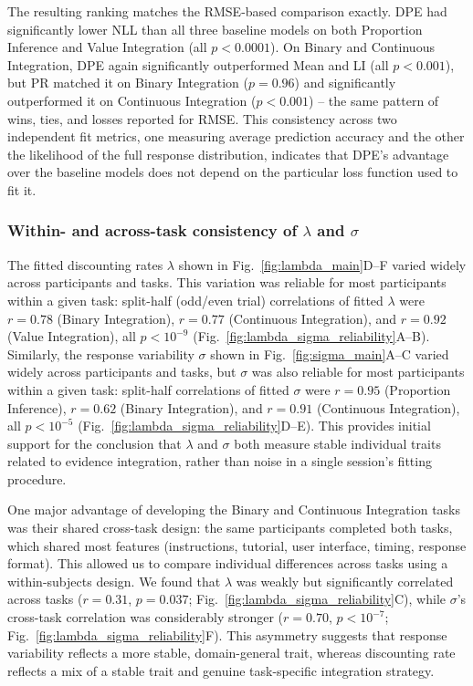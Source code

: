\documentclass[12pt]{article}
\begin{document}
The resulting ranking matches the RMSE-based comparison exactly. DPE had significantly lower NLL than all three baseline models on both Proportion Inference and Value Integration (all $p<0.0001$). On Binary and Continuous Integration, DPE again significantly outperformed Mean and LI (all $p<0.001$), but PR matched it on Binary Integration ($p=0.96$) and significantly outperformed it on Continuous Integration ($p<0.001$) -- the same pattern of wins, ties, and losses reported for RMSE. This consistency across two independent fit metrics, one measuring average prediction accuracy and the other the likelihood of the full response distribution, indicates that DPE's advantage over the baseline models does not depend on the particular loss function used to fit it.

\subsubsection*{Within- and across-task consistency of $\lambda$ and $\sigma$}
The fitted discounting rates $\lambda$ shown in Fig.~\ref{fig:lambda_main}D--F varied widely across participants and tasks. This variation was reliable for most participants within a given task: split-half (odd/even trial) correlations of fitted $\lambda$ were $r=0.78$ (Binary Integration), $r=0.77$ (Continuous Integration), and $r=0.92$ (Value Integration), all $p<10^{-9}$ (Fig.~\ref{fig:lambda_sigma_reliability}A--B). Similarly, the response variability $\sigma$ shown in Fig.~\ref{fig:sigma_main}A--C varied widely across participants and tasks, but $\sigma$ was also reliable for most participants within a given task: split-half correlations of fitted $\sigma$ were $r=0.95$ (Proportion Inference), $r=0.62$ (Binary Integration), and $r=0.91$ (Continuous Integration), all $p<10^{-5}$ (Fig.~\ref{fig:lambda_sigma_reliability}D--E). This provides initial support for the conclusion that $\lambda$ and $\sigma$ both measure stable individual traits related to evidence integration, rather than noise in a single session's fitting procedure.

One major advantage of developing the Binary and Continuous Integration tasks was their shared cross-task design: the same participants completed both tasks, which shared most features (instructions, tutorial, user interface, timing, response format). This allowed us to compare individual differences across tasks using a within-subjects design. We found that $\lambda$ was weakly but significantly correlated across tasks ($r=0.31$, $p=0.037$; Fig.~\ref{fig:lambda_sigma_reliability}C), while $\sigma$'s cross-task correlation was considerably stronger ($r=0.70$, $p<10^{-7}$; Fig.~\ref{fig:lambda_sigma_reliability}F). This asymmetry suggests that response variability reflects a more stable, domain-general trait, whereas discounting rate reflects a mix of a stable trait and genuine task-specific integration strategy.
\end{document}

